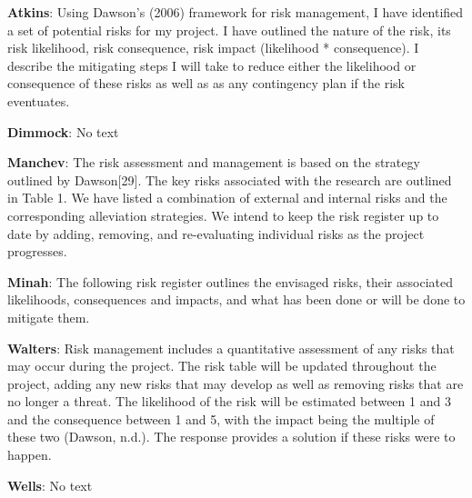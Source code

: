 \textbf{Atkins}: Using Dawson’s (2006) framework for risk management, I have identified a set of potential risks for my project. I have outlined the nature of the
risk, its risk likelihood, risk consequence, risk impact (likelihood * consequence). I describe the mitigating steps I will take to reduce either the
likelihood or consequence of these risks as well as as any contingency plan if the risk eventuates. 

\textbf{Dimmock}: No text  

\textbf{Manchev}: The risk assessment and management is based on the strategy outlined by Dawson[29].
The key risks associated with the research are outlined in Table 1. We have listed a combination
of external and internal risks and the corresponding alleviation strategies.
We intend to keep the risk register up to date by adding, removing, and re-evaluating
individual risks as the project progresses.

\textbf{Minah}: The following risk register outlines the envisaged risks, their associated likelihoods, consequences and impacts, and what has been done or will be done to mitigate them. 

\textbf{Walters}: Risk management includes a quantitative assessment of any risks that may occur during the
project. The risk table will be updated throughout the project, adding any new risks that may
develop as well as removing risks that are no longer a threat. The likelihood of the risk will be
estimated between 1 and 3 and the consequence between 1 and 5, with the impact being the
multiple of these two (Dawson, n.d.). The response provides a solution if these risks were to
happen.  

\textbf{Wells}: No text
